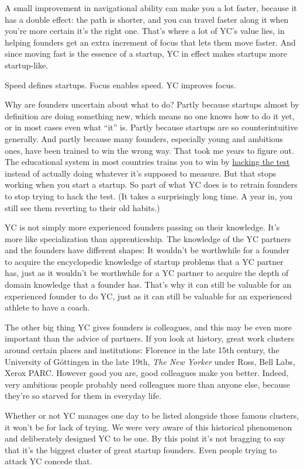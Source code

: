 A small improvement in navigational ability can make you a lot faster,
because it has a double effect: the path is shorter, and you can travel
faster along it when you're more certain it's the right one. That's
where a lot of YC's value lies, in helping founders get an extra
increment of focus that lets them move faster. And since moving fast is
the essence of a startup, YC in effect makes startups more startup-like.

Speed defines startups. Focus enables speed. YC improves focus.

Why are founders uncertain about what to do? Partly because startups
almost by definition are doing something new, which means no one knows
how to do it yet, or in most cases even what ``it'' is. Partly because
startups are so counterintuitive generally. And partly because many
founders, especially young and ambitious ones, have been trained to win
the wrong way. That took me years to figure out. The educational system
in most countries trains you to win by \href{lesson.html}{hacking the
test} instead of actually doing whatever it's supposed to measure. But
that stops working when you start a startup. So part of what YC does is
to retrain founders to stop trying to hack the test. (It takes a
surprisingly long time. A year in, you still see them reverting to their
old habits.)

YC is not simply more experienced founders passing on their knowledge.
It's more like specialization than apprenticeship. The knowledge of the
YC partners and the founders have different shapes: It wouldn't be
worthwhile for a founder to acquire the encyclopedic knowledge of
startup problems that a YC partner has, just as it wouldn't be
worthwhile for a YC partner to acquire the depth of domain knowledge
that a founder has. That's why it can still be valuable for an
experienced founder to do YC, just as it can still be valuable for an
experienced athlete to have a coach.

The other big thing YC gives founders is colleagues, and this may be
even more important than the advice of partners. If you look at history,
great work clusters around certain places and institutions: Florence in
the late 15th century, the University of Göttingen in the late 19th,
\emph{The New Yorker} under Ross, Bell Labs, Xerox PARC. However good
you are, good colleagues make you better. Indeed, very ambitious people
probably need colleagues more than anyone else, because they're so
starved for them in everyday life.

Whether or not YC manages one day to be listed alongside those famous
clusters, it won't be for lack of trying. We were very aware of this
historical phenomenon and deliberately designed YC to be one. By this
point it's not bragging to say that it's the biggest cluster of great
startup founders. Even people trying to attack YC concede that.

